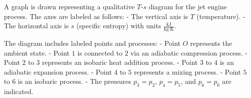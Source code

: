 A graph is drawn representing a qualitative \( T \)-\( s \) diagram for the jet engine process. The axes are labeled as follows:  
- The vertical axis is \( T \) (temperature).  
- The horizontal axis is \( s \) (specific entropy) with units \( \frac{\text{kJ}}{\text{kg·K}} \).  

The diagram includes labeled points and processes:  
- Point \( O \) represents the ambient state.  
- Point \( 1 \) is connected to \( 2 \) via an adiabatic compression process.  
- Point \( 2 \) to \( 3 \) represents an isobaric heat addition process.  
- Point \( 3 \) to \( 4 \) is an adiabatic expansion process.  
- Point \( 4 \) to \( 5 \) represents a mixing process.  
- Point \( 5 \) to \( 6 \) is an isobaric process.  
- The pressures \( p_3 = p_2 \), \( p_4 = p_5 \), and \( p_6 = p_0 \) are indicated.